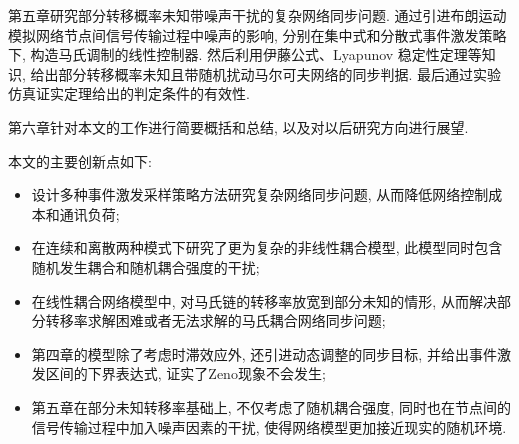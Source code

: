 
第五章研究部分转移概率未知带噪声干扰的复杂网络同步问题. 通过引进布朗运动模拟网络节点间信号传输过程中噪声的影响, 分别在集中式和分散式事件激发策略下, 构造马氏调制的线性控制器. 然后利用伊藤公式、Lyapunov 稳定性定理等知识, 给出部分转移概率未知且带随机扰动马尔可夫网络的同步判据. 最后通过实验仿真证实定理给出的判定条件的有效性.


第六章针对本文的工作进行简要概括和总结, 以及对以后研究方向进行展望.

本文的主要创新点如下:
\begin{itemize}\setlength{\itemsep}{0cm}

  \item 设计多种事件激发采样策略方法研究复杂网络同步问题, 从而降低网络控制成本和通讯负荷;
  \item 在连续和离散两种模式下研究了更为复杂的非线性耦合模型, 此模型同时包含随机发生耦合和随机耦合强度的干扰;
  \item 在线性耦合网络模型中, 对马氏链的转移率放宽到部分未知的情形, 从而解决部分转移率求解困难或者无法求解的马氏耦合网络同步问题;
  \item 第四章的模型除了考虑时滞效应外, 还引进动态调整的同步目标, 并给出事件激发区间的下界表达式, 证实了Zeno现象不会发生;
  \item 第五章在部分未知转移率基础上, 不仅考虑了随机耦合强度, 同时也在节点间的信号传输过程中加入噪声因素的干扰, 使得网络模型更加接近现实的随机环境.
\end{itemize}


